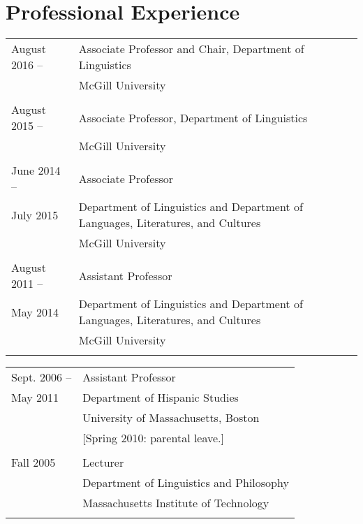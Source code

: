 \documentclass[11pt]{article}
\begin{document}
\section*{Professional Experience}

\begin{tabular}{p{2.815cm}p{280pt}}
August 2016 -- & Associate Professor and Chair, Department of Linguistics\\
 &McGill University\\
 & \\[-8pt]
August 2015 -- & Associate Professor, Department of Linguistics\\
 & McGill University\\
  & \\[-8pt]
June 2014 -- &  Associate Professor\\
July 2015 & Department of Linguistics and Department of Languages, Literatures, and Cultures\\ 
& McGill University\\
& \\[-8pt]
August 2011 -- &  Assistant Professor\\
May 2014& Department of Linguistics and Department of Languages, Literatures, and Cultures\\ 
& McGill University\\
& \\[-8pt]
\end{tabular}
\begin{tabular}{p{2.815cm}p{280pt}}
Sept. 2006 -- & Assistant Professor\\
May 2011&   Department of
Hispanic Studies\\
&  University of Massachusetts, Boston\\
 &  \footnotesize{[Spring 2010: parental leave.]}\\
& \\[-8pt]
Fall 2005 & Lecturer \\
& Department of Linguistics and Philosophy \\ 
& Massachusetts Institute of Technology\\
& \\[-8pt]
\end{tabular}
\end{document}
